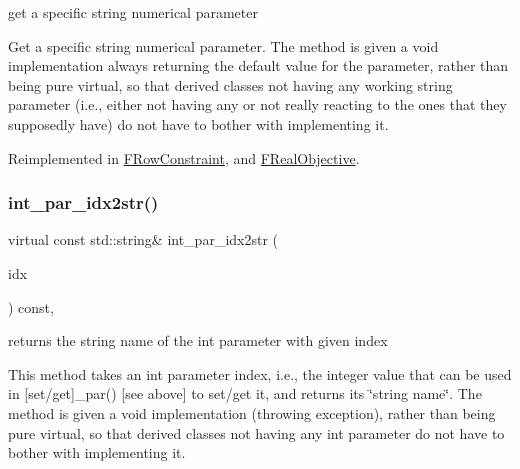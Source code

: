 get a specific string numerical parameter 

Get a specific string numerical parameter. The method is given a void implementation always returning the default value for the parameter, rather than being pure virtual, so that derived classes not having any working string parameter (i.\+e., either not having any or not really reacting to the ones that they supposedly have) do not have to bother with implementing it. 

Reimplemented in \mbox{\hyperlink{class_s_m_spp__di__unipi__it_1_1_f_row_constraint_a3e17318e51ccc01da85e2627b810d6a7}{F\+Row\+Constraint}}, and \mbox{\hyperlink{class_s_m_spp__di__unipi__it_1_1_f_real_objective_a3e17318e51ccc01da85e2627b810d6a7}{F\+Real\+Objective}}.

\mbox{\label{class_s_m_spp__di__unipi__it_1_1_thin_compute_interface_a3d3d1ca3218d2d640614ed75a960ef01}} 
\subsubsection{\texorpdfstring{int\+\_\+par\+\_\+idx2str()}{int\_par\_idx2str()}}
{\footnotesize\ttfamily virtual const std\+::string\& int\+\_\+par\+\_\+idx2str (\begin{DoxyParamCaption}\item[{const \mbox{\hyperlink{class_s_m_spp__di__unipi__it_1_1_thin_compute_interface_aa3d710629ad8c434286726ad810c3b47}{idx\+\_\+type}}}]{idx }\end{DoxyParamCaption}) const\hspace{0.3cm}{\ttfamily [inline]}, {\ttfamily [virtual]}}



returns the string name of the int parameter with given index 

This method takes an int parameter index, i.\+e., the integer value that can be used in \mbox{[}set/get\mbox{]}\+\_\+par() \mbox{[}see above\mbox{]} to set/get it, and returns its \char`\"{}string name\char`\"{}. The method is given a void implementation (throwing exception), rather than being pure virtual, so that derived classes not having any int parameter do not have to bother with implementing it. 

